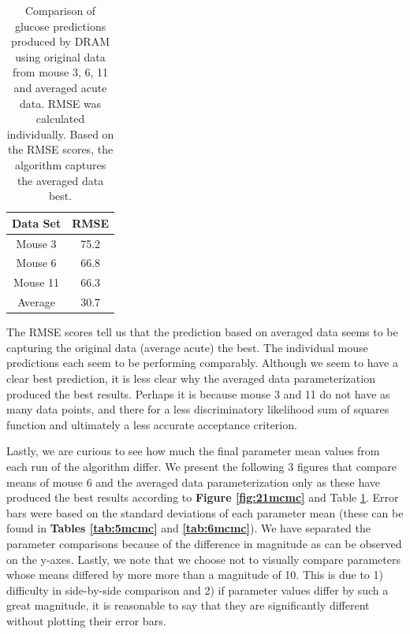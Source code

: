 \documentclass{article}
\begin{document}
\begin{table}[H]
\centering
        \begin{tabular}{c | c}
            \cline{1-2}
            \textbf{Data Set}  &\textbf{RMSE}\\
            \hline
            Mouse 3 & 75.2\\
            Mouse 6 & 66.8\\
            Mouse 11 & 66.3\\
            Average & 30.7
             \\\hline
            \hline
        \end{tabular}
    \caption{Comparison of glucose predictions produced by DRAM using original data from mouse 3, 6, 11 and averaged acute data. RMSE was calculated individually. Based on the RMSE scores, the algorithm captures the averaged data best.}
    \label{tab:7mcmc} 
\end{table}
The RMSE scores tell us that the prediction based on averaged data seems to be capturing the original data (average acute) the best. The individual mouse predictions each seem to be performing comparably. Although we seem to have a clear best prediction, it is less clear why the averaged data parameterization produced the best results. Perhaps it is because mouse 3 and 11 do not have as many data points, and there for a less discriminatory likelihood sum of squares function and ultimately a less accurate acceptance criterion.
\par Lastly, we are curious to see how much the final parameter mean values from each run of the algorithm differ. We present the following 3 figures that compare means of mouse 6 and the averaged data parameterization only as these have produced the best results according to \textbf{Figure \ref{fig:21mcmc}} and Table \ref{tab:7mcmc}. Error bars were based on the standard deviations of each parameter mean (these can be found in \textbf{Tables 
\ref{tab:5mcmc}} and \textbf{\ref{tab:6mcmc}}). We have separated the parameter comparisons because of the difference in magnitude as can be observed on the y-axes. Lastly, we note that we choose not to visually compare parameters whose means differed by more more than a magnitude of 10. This is due to 1) difficulty in side-by-side comparison and 2) if parameter values differ by such a great magnitude, it is reasonable to say that they are significantly different without plotting their error bars.
\end{document}
